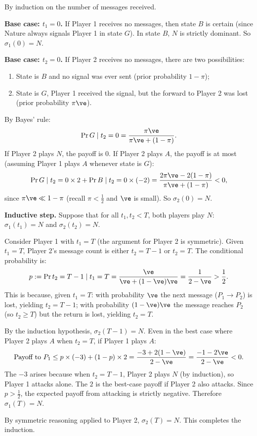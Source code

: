 \begin{proppf}
  By induction on the number of messages received.
  
  \medskip
  \noindent\textbf{Base case: $t_1 = 0$.} If Player 1 receives no messages, then state $B$ is certain (since Nature always signals Player 1 in state $G$). In state $B$, $N$ is strictly dominant. So $\sigma_1(0) = N$.
  
  \medskip
  \noindent\textbf{Base case: $t_2 = 0$.} If Player 2 receives no messages, there are two possibilities:
  \begin{enumerate}[label=(\roman*)]
    \item State is $B$ and no signal was ever sent (prior probability $1 - \pi$);
    \item State is $G$, Player 1 received the signal, but the forward to Player 2 was lost (prior probability $\pi\ve$).
  \end{enumerate}
  By Bayes' rule:
  \[
  \Pr{G \mid t_2 = 0} = \frac{\pi\ve}{\pi\ve + (1 - \pi)}.
  \]
  If Player 2 plays $N$, the payoff is 0. If Player 2 plays $A$, the payoff is at most (assuming Player 1 plays $A$ whenever state is $G$):
  \[
  \Pr{G \mid t_2 = 0} \times 2 + \Pr{B \mid t_2 = 0} \times (-2) = \frac{2\pi\ve - 2(1 - \pi)}{\pi\ve + (1 - \pi)} < 0,
  \]
  since $\pi\ve \ll 1 - \pi$ (recall $\pi < \frac{1}{2}$ and $\ve$ is small). So $\sigma_2(0) = N$.
  
  \medskip
  \noindent\textbf{Inductive step.} Suppose that for all $t_1, t_2 < T$, both players play $N$: $\sigma_1(t_1) = N$ and $\sigma_2(t_2) = N$.
  
  Consider Player 1 with $t_1 = T$ (the argument for Player 2 is symmetric). Given $t_1 = T$, Player 2's message count is either $t_2 = T - 1$ or $t_2 = T$. The conditional probability is:
  \[
  p := \Pr{t_2 = T - 1 \mid t_1 = T} = \frac{\ve}{\ve + (1-\ve)\ve} = \frac{1}{2 - \ve} > \frac{1}{2}.
  \]
  This is because, given $t_1 = T$: with probability $\ve$ the next message ($P_1 \to P_2$) is lost, yielding $t_2 = T-1$; with probability $(1-\ve)\ve$ the message reaches $P_2$ (so $t_2 \ge T$) but the return is lost, yielding $t_2 = T$.
  
  By the induction hypothesis, $\sigma_2(T-1) = N$. Even in the best case where Player 2 plays $A$ when $t_2 = T$, if Player 1 plays $A$:
  \[
  \text{Payoff to } P_1 \le p \times (-3) + (1 - p) \times 2 = \frac{-3 + 2(1 - \ve)}{2 - \ve} = \frac{-1 - 2\ve}{2 - \ve} < 0.
  \]
  The $-3$ arises because when $t_2 = T-1$, Player 2 plays $N$ (by induction), so Player 1 attacks alone. The $2$ is the best-case payoff if Player 2 also attacks. Since $p > \frac{1}{2}$, the expected payoff from attacking is strictly negative. Therefore $\sigma_1(T) = N$.
  
  By symmetric reasoning applied to Player 2, $\sigma_2(T) = N$. This completes the induction.
\end{proppf}

